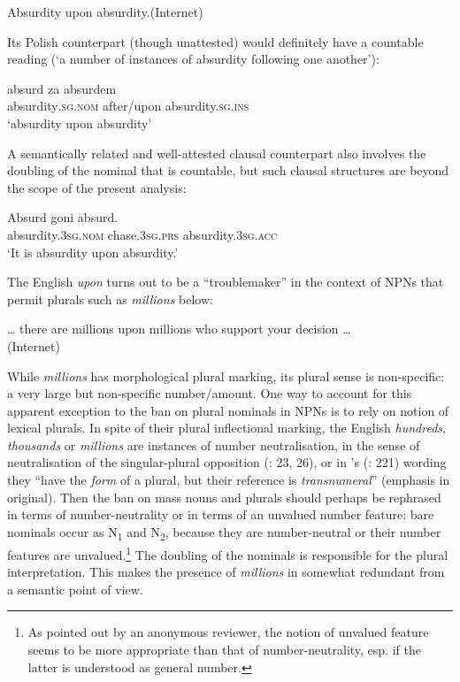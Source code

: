 \documentclass[output=paper]{langscibook}
\begin{document}
\ea \label{psk:ex:key:5}  Absurdity upon absurdity.\hfill (Internet)\\
\z

\noindent Its Polish counterpart (though unattested) would definitely have a countable reading (‘a number of instances of absurdity following one another’):

\ea\gll\label{psk:ex:key:6}absurd                za             absurdem\\
       absurdity\textsc{.sg.nom} after/upon absurdity.\textsc{sg.ins}\\
\glt   ‘absurdity upon absurdity’\z

\noindent A semantically related and well-attested clausal counterpart also involves the doubling of the nominal that is countable, but such clausal structures are beyond the scope of the present analysis:

\ea\gll\label{psk:ex:key:7}Absurd                 goni              absurd.\\
       absurdity.\textsc{3sg.nom} chase.\textsc{3sg.prs} absurdity.\textsc{3sg.acc}\\
\glt ‘It is absurdity upon absurdity.’
\z

\noindent The English \textit{upon} turns out to be a ``troublemaker'' in the context of NPNs that permit plurals such as \textit{millions} below:

\ea \label{psk:ex:key:8}  … there are millions upon millions who support your decision …\vspace{-12pt}\\\null\hfill (Internet)\\
\z

\noindent While \textit{millions} has morphological plural marking, its plural sense is non-specific: a very large but non-specific number/amount. One way to account for this apparent exception to the ban on plural nominals in NPNs is to rely on  notion of lexical plurals. In spite of their plural inflectional marking, the English \textit{hundreds}, \textit{thousands} or \textit{millions} are instances of number neutralisation, in the sense of neutralisation of the singular-plural opposition (\citealt{Acquaviva2008}: 23, 26), or in \citeauthor{Link1998}'s (\citeyear{Link1998}: 221) wording they “have the \textit{form} of a plural, but their reference is \textit{transnumeral}” (emphasis in original). Then the ban on mass nouns and plurals should perhaps be rephrased in terms of number-neutrality or in terms of an unvalued number feature: bare nominals occur as N\textsubscript{1} and N\textsubscript{2}, because they are number-neutral or their number features are unvalued.\footnote{As pointed out by an anonymous reviewer, the notion of unvalued feature seems to be more appropriate than that of number-neutrality, esp. if the latter is understood as general number.} The doubling of the nominals is responsible for the plural interpretation. This makes the presence of \textit{millions} in  somewhat redundant from a semantic point of view.
\end{document}
